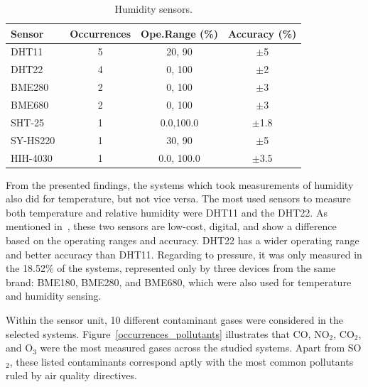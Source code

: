 \documentclass[10pt]{../imeko_acta}
\begin{document}
\begin{table}[!tb]
	\caption{Humidity sensors.}
	\label{tabHum}
	\centering
\begin{tabularx}{\columnwidth}{lCCC}
	\toprule
	Sensor	& Occurrences	& Ope.Range (\unit{\percent}) & Accuracy (\unit{\percent})\\
	\midrule
	DHT11~\cite{dht11}      & 5 &  20, 90       & $\pm$5\\
	DHT22~\cite{dht22}      & 4 & 0, 100        & $\pm$2 \\
	BME280~\cite{BME280}    & 2 & 0, 100        & $\pm$3  \\
	BME680~\cite{BME680}    & 2 & 0, 100        & $\pm$3 \\
	SHT-25~\cite{sht25}     & 1 & 0.0,100.0     & $\pm$1.8  \\
	SY-HS220~\cite{SYHS220} & 1 & 30, 90        & $\pm$5 \\
	HIH-4030~\cite{HIH4030} & 1 & 0.0, 100.0    & $\pm$3.5 \\
	\bottomrule
\end{tabularx}
\end{table}

From the presented findings, the systems which took measurements of humidity also did for temperature, but not vice versa.  The most used sensors to measure both temperature and relative humidity were DHT11 and the DHT22. As mentioned in~\cite{9826978}, these two sensors are low-cost, digital, and show a difference based on the operating ranges and accuracy. DHT22 has a wider operating range and better accuracy than DHT11. Regarding to pressure, it was only measured in the 18.52\% of the systems, represented only by three devices from the same brand: BME180, BME280, and BME680, which were also used for temperature and humidity sensing.

Within the sensor unit, 10 different contaminant gases were considered in the selected systems. Figure~\ref{occurrences_pollutants} illustrates that CO, NO$_{2}$, CO$_{2}$, and O$_{3}$ were the most measured gases across the studied systems. Apart from SO$_2$, these listed contaminants correspond aptly with the most common pollutants ruled by air quality directives.
\end{document}
